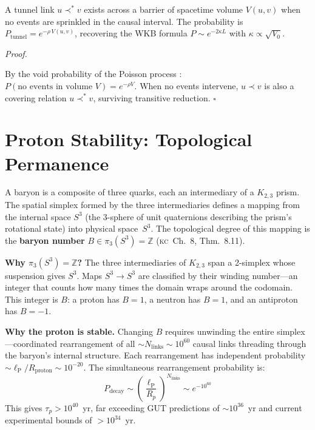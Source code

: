 \documentclass[11pt, a4paper, openany]{book}
\newcommand{\lP}{\ell_{\mathrm{P}}}
\newcommand{\covers}{\prec^*}              %
\newcommand{\KC}[1]{\textnormal{(\textsc{kc}~#1)}}
\newcounter{thm}[chapter]
\renewenvironment{proof}[1][Proof]{%
  \par\noindent\textit{#1.}\quad
}{\hfill$\square$\par\medskip}
\begin{document}
\begin{theorem}\label{thm:tunneling}
A tunnel link $u \covers v$ exists across a barrier of spacetime volume $V(u,v)$ when no events are sprinkled in the causal interval. The probability is $P_{\mathrm{tunnel}} = e^{-\rho\,V(u,v)}$, recovering the WKB formula $P \sim e^{-2\kappa L}$ with $\kappa \propto \sqrt{V_0}$.
\end{theorem}

\begin{proof}
By the void probability of the Poisson process \cite{kingman1993}: $P(\text{no events in volume } V) = e^{-\rho V}$. When no events intervene, $u \prec v$ is also a covering relation $u \covers v$, surviving transitive reduction.
\end{proof}

\section{Proton Stability: Topological Permanence}\label{sec:proton}

A baryon is a composite of three quarks, each an intermediary of a
$K_{2,3}$ prism. The spatial simplex formed by the three intermediaries
defines a mapping from the internal space $S^3$ (the 3-sphere of unit
quaternions describing the prism's rotational state) into physical
space~$S^3$. The topological degree of this mapping is the
\textbf{baryon number} $B \in \pi_3(S^3) = \mathbb{Z}$
\cite{skyrme1961} \KC{Ch.~8, Thm.~8.11}.

\textbf{Why $\pi_3(S^3) = \mathbb{Z}$?} The three intermediaries of
$K_{2,3}$ span a 2-simplex whose suspension gives $S^3$. Maps
$S^3 \to S^3$ are classified by their winding number---an integer
that counts how many times the domain wraps around the codomain. This
integer is $B$: a proton has $B = 1$, a neutron has $B = 1$, and an
antiproton has $B = -1$.

\textbf{Why the proton is stable.} Changing $B$ requires unwinding
the entire simplex---coordinated rearrangement of all
$\sim N_{\mathrm{links}} \sim 10^{60}$ causal links threading through
the baryon's internal structure. Each rearrangement has independent
probability $\sim \lP/R_{\mathrm{proton}} \sim 10^{-20}$. The
simultaneous rearrangement probability is:
\[
  P_{\mathrm{decay}} \sim
  \left(\frac{\lP}{R_p}\right)^{N_{\mathrm{links}}}
  \sim e^{-10^{60}}
\]
This gives $\tau_p > 10^{40}$~yr, far exceeding GUT predictions of
$\sim 10^{36}$~yr and current experimental bounds of
$> 10^{34}$~yr.
\end{document}
